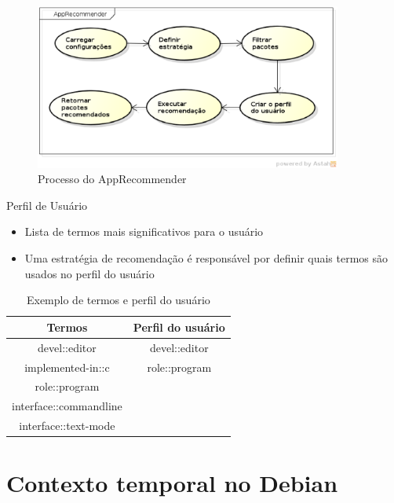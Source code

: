 \begin{frame}
\begin{figure}[h]
  \centering
  \includegraphics[width=0.9\textwidth]{figura/app_recommender_process.eps}
  \caption{Processo do AppRecommender}
  \label{fig:curva_aprendizado}
\end{figure}
\end{frame}

\begin{frame}
    Perfil de Usuário
    \begin{itemize}
        \item Lista de termos mais significativos para o usuário
        \item Uma estratégia de recomendação é responsável por definir quais termos
        são usados no perfil do usuário
    \end{itemize}

    \begin{table}[h]
    \centering
    \begin{tabular}{cc}
    \hline
    \rowcolor[HTML]{EFEFEF}
    {Termos} & {Perfil do usuário} \\ \hline
    {devel::editor} & {devel::editor} \\ \hline
    {implemented-in::c} & {role::program} \\ \hline
    {role::program} & {} \\ \hline
    {interface::commandline} & {} \\ \hline
    {interface::text-mode} & {} \\ \hline
    \end{tabular}
    \caption{Exemplo de termos e perfil do usuário}
    \label{tab:classificacao_pacotes}
    \end{table}
\end{frame}

\section{Contexto temporal no Debian} %
\label{sec:d}

